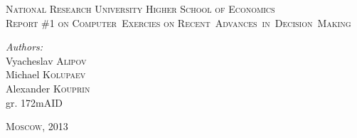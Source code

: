 \begin{titlepage}

\begin{center}
	\textsc{\Large National Research University Higher School of Economics}\\[8cm]

	\textsc{\large Report \#1 on Computer~Exercies on Recent~Advances~in~Decision~Making}\\[8cm]
\end{center}

\begin{flushright}
	\emph{Authors:}\\
	Vyacheslav \textsc{Alipov}\\
	Michael \textsc{Kolupaev}\\
	Alexander \textsc{Kouprin}\\
	gr. 172mAID
\end{flushright}

\vfill

\begin{center}
	\textsc{\large Moscow, 2013}
\end{center}

\end{titlepage}
